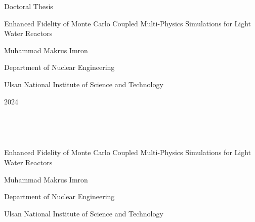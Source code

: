 \documentclass[11pt,a4paper,onecolumn,oneside]{report}
\begin{document}


\begin{center}
\LARGE Doctoral Thesis

\vspace{3cm}
\huge Enhanced Fidelity of Monte Carlo Coupled Multi-Physics Simulations for Light Water Reactors

\vfill

\LARGE Muhammad Makrus Imron

\vspace{2cm}

\LARGE Department of Nuclear Engineering 

\vspace{2cm}

\LARGE Ulsan National Institute of Science and Technology
\vspace{2cm}

\LARGE 2024

\end{center}
\thispagestyle{empty}
\clearpage

\begin{center}
\hbox{ }

\hbox{ }

\huge Enhanced Fidelity of Monte Carlo Coupled Multi-Physics Simulations for Light Water Reactors 

\vspace{5cm}

\LARGE Muhammad Makrus Imron

\vspace{6cm}

\LARGE Department of Nuclear Engineering 

\vspace{2cm}

\LARGE Ulsan National Institute of Science and Technology

\end{center}
\thispagestyle{empty}
\clearpage


%
\end{document}
